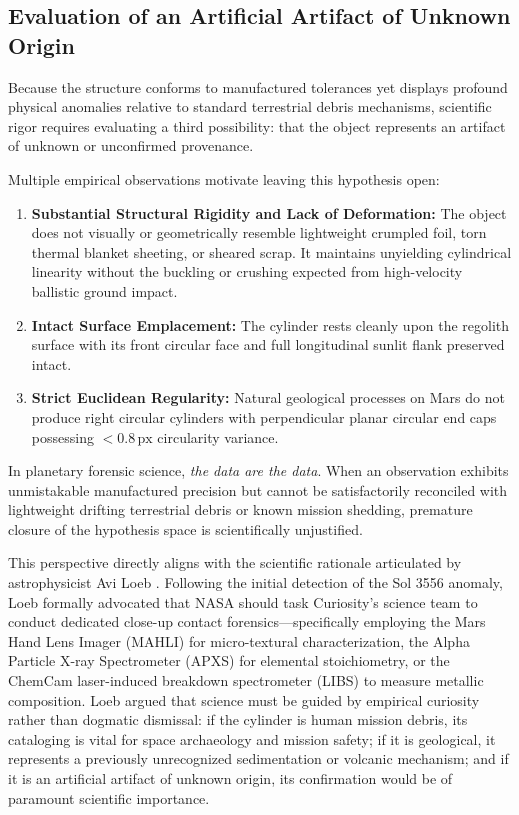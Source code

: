 \documentclass[11pt,a4paper]{article}
\begin{document}
\subsection{Evaluation of an Artificial Artifact of Unknown Origin}
Because the structure conforms to manufactured tolerances yet displays profound physical anomalies relative to standard terrestrial debris mechanisms, scientific rigor requires evaluating a third possibility: that the object represents an artifact of unknown or unconfirmed provenance. 

Multiple empirical observations motivate leaving this hypothesis open:
\begin{enumerate}
    \item \textbf{Substantial Structural Rigidity and Lack of Deformation:} The object does not visually or geometrically resemble lightweight crumpled foil, torn thermal blanket sheeting, or sheared scrap. It maintains unyielding cylindrical linearity without the buckling or crushing expected from high-velocity ballistic ground impact.
    \item \textbf{Intact Surface Emplacement:} The cylinder rests cleanly upon the regolith surface with its front circular face and full longitudinal sunlit flank preserved intact.
    \item \textbf{Strict Euclidean Regularity:} Natural geological processes on Mars do not produce right circular cylinders with perpendicular planar circular end caps possessing $< 0.8\,\text{px}$ circularity variance.
\end{enumerate}
In planetary forensic science, \textit{the data are the data}. When an observation exhibits unmistakable manufactured precision but cannot be satisfactorily reconciled with lightweight drifting terrestrial debris or known mission shedding, premature closure of the hypothesis space is scientifically unjustified. 

This perspective directly aligns with the scientific rationale articulated by astrophysicist Avi Loeb \cite{loeb2022}. Following the initial detection of the Sol 3556 anomaly, Loeb formally advocated that NASA should task Curiosity's science team to conduct dedicated close-up contact forensics---specifically employing the Mars Hand Lens Imager (MAHLI) for micro-textural characterization, the Alpha Particle X-ray Spectrometer (APXS) for elemental stoichiometry, or the ChemCam laser-induced breakdown spectrometer (LIBS) to measure metallic composition. Loeb argued that science must be guided by empirical curiosity rather than dogmatic dismissal: if the cylinder is human mission debris, its cataloging is vital for space archaeology and mission safety; if it is geological, it represents a previously unrecognized sedimentation or volcanic mechanism; and if it is an artificial artifact of unknown origin, its confirmation would be of paramount scientific importance. 
\end{document}
